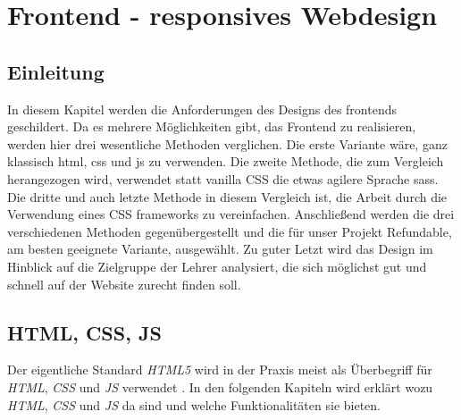 
\section{Frontend - responsives Webdesign}
	\subsection{Einleitung}
	In diesem Kapitel werden die Anforderungen des Designs des \Gls{frontend}s geschildert. Da es mehrere Möglichkeiten gibt, das Frontend zu realisieren, werden hier drei wesentliche Methoden verglichen. Die erste Variante wäre, ganz klassisch \Gls{html}, \Gls{css} und \Gls{js} zu verwenden. Die zweite Methode, die zum Vergleich herangezogen wird, verwendet statt \Gls{vanilla} CSS die etwas agilere Sprache \Gls{sass}. Die dritte und auch letzte Methode in diesem Vergleich ist, die Arbeit durch die Verwendung eines CSS \Gls{framework}s zu vereinfachen. Anschließend werden die drei verschiedenen Methoden gegenübergestellt und die für unser Projekt Refundable, am besten geeignete Variante, ausgewählt. Zu guter Letzt wird das Design im Hinblick auf die Zielgruppe der Lehrer analysiert, die sich möglichst gut und schnell auf der Website zurecht finden soll.
	
	\subsection{HTML, CSS, JS}
	Der eigentliche Standard \textit{HTML5} wird in der Praxis meist als Überbegriff für \textit{HTML}, \textit{CSS} und \textit{JS} verwendet \cite{html5-css3-handbuch}. In den folgenden Kapiteln wird erklärt wozu \textit{HTML}, \textit{CSS} und \textit{JS} da sind und welche Funktionalitäten sie bieten.
	
